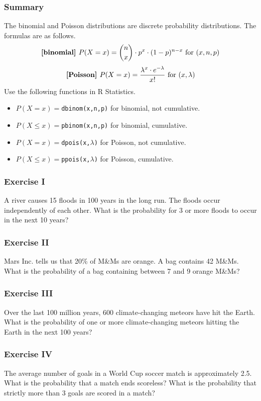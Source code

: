 \documentclass[xcolor=dvipsnames]{beamer}
\begin{document}
\begin{frame}
  \frametitle{Summary}
The binomial and Poisson distributions are discrete probability
distributions. The formulas are as follows.
\begin{equation}
  \label{eq:hiechoib}
  \mbox{\textbf{[binomial] }}P(X=x)=\binom{n}{x}\cdot{}p^{x}\cdot(1-p)^{n-x}\mbox{ for }(x,n,p)\notag
\end{equation}
\begin{equation}
  \label{eq:iechahve}
  \mbox{\textbf{[Poisson] }}P(X=x)=\frac{\lambda^{x}\cdot{}e^{-\lambda}}{x!}\mbox{ for }(x,\lambda)\notag
\end{equation}
Use the following functions in R Statistics.
\begin{itemize}
\item $P(X=x)=$\texttt{dbinom(x,n,p)} for binomial, not cumulative.
\item $P(X\leq{}x)=$\texttt{pbinom(x,n,p)} for binomial, cumulative.
\item $P(X=x)=$\texttt{dpois(x,$\lambda$)} for Poisson, not cumulative.
\item $P(X\leq{}x)=$\texttt{ppois(x,$\lambda$)} for Poisson, cumulative.
\end{itemize}
\end{frame}

\begin{frame}
  \frametitle{Exercise I}
  {\ubung} A river causes 15 floods in 100 years in the long run. The
  floods occur independently of each other. What is the probability
  for 3 or more floods to occur in the next 10 years?
\end{frame}

\begin{frame}
  \frametitle{Exercise II}
  {\ubung} Mars Inc. tells us that 20\% of M\&Ms are orange. A bag
  contains 42 M\&Ms. What is the probability of a bag containing
  between 7 and 9 orange M\&Ms?
\end{frame}

\begin{frame}
  \frametitle{Exercise III}
  {\ubung} Over the last 100 million years, 600 climate-changing
  meteors have hit the Earth. What is the probability of one or more
  climate-changing meteors hitting the Earth in the next 100 years?
\end{frame}

\begin{frame}
  \frametitle{Exercise IV}
  {\ubung} The average number of goals in a World Cup soccer match is
  approximately 2.5. What is the probability that a match ends
  scoreless? What is the probability that strictly more than 3 goals
  are scored in a match?
\end{frame}
\end{document}
